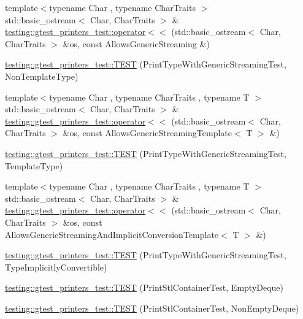 \begin{DoxyCompactItemize}
\item 
{\footnotesize template$<$typename Char , typename Char\+Traits $>$ }\\std\+::basic\+\_\+ostream$<$ Char, Char\+Traits $>$ \& \mbox{\hyperlink{namespacetesting_1_1gtest__printers__test_a55578d45fb44ffa9660db56546150889}{testing\+::gtest\+\_\+printers\+\_\+test\+::operator$<$$<$}} (std\+::basic\+\_\+ostream$<$ Char, Char\+Traits $>$ \&os, const Allows\+Generic\+Streaming \&)
\item 
\mbox{\hyperlink{namespacetesting_1_1gtest__printers__test_a9272037c799c4779e1d79476dad66cb6}{testing\+::gtest\+\_\+printers\+\_\+test\+::\+T\+E\+ST}} (Print\+Type\+With\+Generic\+Streaming\+Test, Non\+Template\+Type)
\item 
{\footnotesize template$<$typename Char , typename Char\+Traits , typename T $>$ }\\std\+::basic\+\_\+ostream$<$ Char, Char\+Traits $>$ \& \mbox{\hyperlink{namespacetesting_1_1gtest__printers__test_a4f5bb6b21a29bf99df1e27a1876d921c}{testing\+::gtest\+\_\+printers\+\_\+test\+::operator$<$$<$}} (std\+::basic\+\_\+ostream$<$ Char, Char\+Traits $>$ \&os, const Allows\+Generic\+Streaming\+Template$<$ T $>$ \&)
\item 
\mbox{\hyperlink{namespacetesting_1_1gtest__printers__test_a6e180c85f307712a995985f7bc735fd1}{testing\+::gtest\+\_\+printers\+\_\+test\+::\+T\+E\+ST}} (Print\+Type\+With\+Generic\+Streaming\+Test, Template\+Type)
\item 
{\footnotesize template$<$typename Char , typename Char\+Traits , typename T $>$ }\\std\+::basic\+\_\+ostream$<$ Char, Char\+Traits $>$ \& \mbox{\hyperlink{namespacetesting_1_1gtest__printers__test_aa9c63d8e146c98f3277ffba8b29b3c5e}{testing\+::gtest\+\_\+printers\+\_\+test\+::operator$<$$<$}} (std\+::basic\+\_\+ostream$<$ Char, Char\+Traits $>$ \&os, const Allows\+Generic\+Streaming\+And\+Implicit\+Conversion\+Template$<$ T $>$ \&)
\item 
\mbox{\hyperlink{namespacetesting_1_1gtest__printers__test_a68877c5e1ec7a53281798310c30e1776}{testing\+::gtest\+\_\+printers\+\_\+test\+::\+T\+E\+ST}} (Print\+Type\+With\+Generic\+Streaming\+Test, Type\+Implicitly\+Convertible)
\item 
\mbox{\hyperlink{namespacetesting_1_1gtest__printers__test_a1ce10b8a3634e0f6bfbfbb5888c04a95}{testing\+::gtest\+\_\+printers\+\_\+test\+::\+T\+E\+ST}} (Print\+Stl\+Container\+Test, Empty\+Deque)
\item 
\mbox{\hyperlink{namespacetesting_1_1gtest__printers__test_a249d482cf4a1525bd043489dcbd3e200}{testing\+::gtest\+\_\+printers\+\_\+test\+::\+T\+E\+ST}} (Print\+Stl\+Container\+Test, Non\+Empty\+Deque)

\end{DoxyCompactItemize}
